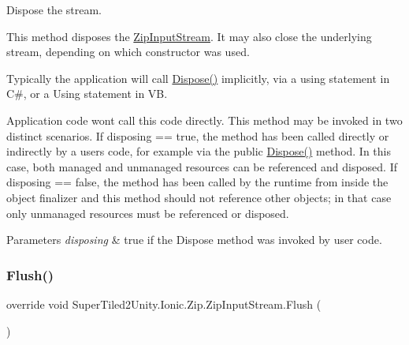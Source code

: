 Dispose the stream. 

This method disposes the \mbox{\hyperlink{class_super_tiled2_unity_1_1_ionic_1_1_zip_1_1_zip_input_stream}{Zip\+Input\+Stream}}. It may also close the underlying stream, depending on which constructor was used. 

Typically the application will call {\ttfamily \mbox{\hyperlink{class_super_tiled2_unity_1_1_ionic_1_1_zip_1_1_zip_input_stream_a27f6b4a5f9fd86beaf360d8b1594b91d}{Dispose()}}} implicitly, via a {\ttfamily using} statement in C\#, or a {\ttfamily Using} statement in VB. 

Application code won\textquotesingle{}t call this code directly. This method may be invoked in two distinct scenarios. If disposing == true, the method has been called directly or indirectly by a user\textquotesingle{}s code, for example via the public \mbox{\hyperlink{class_super_tiled2_unity_1_1_ionic_1_1_zip_1_1_zip_input_stream_a27f6b4a5f9fd86beaf360d8b1594b91d}{Dispose()}} method. In this case, both managed and unmanaged resources can be referenced and disposed. If disposing == false, the method has been called by the runtime from inside the object finalizer and this method should not reference other objects; in that case only unmanaged resources must be referenced or disposed. 


\begin{DoxyParams}{Parameters}
{\em disposing} & true if the Dispose method was invoked by user code. \\
\hline
\end{DoxyParams}
\mbox{\label{class_super_tiled2_unity_1_1_ionic_1_1_zip_1_1_zip_input_stream_aeb026d271ed4735218e0a828e894bfb2}} 
\subsubsection{\texorpdfstring{Flush()}{Flush()}}
{\footnotesize\ttfamily override void Super\+Tiled2\+Unity.\+Ionic.\+Zip.\+Zip\+Input\+Stream.\+Flush (\begin{DoxyParamCaption}{ }\end{DoxyParamCaption})}



